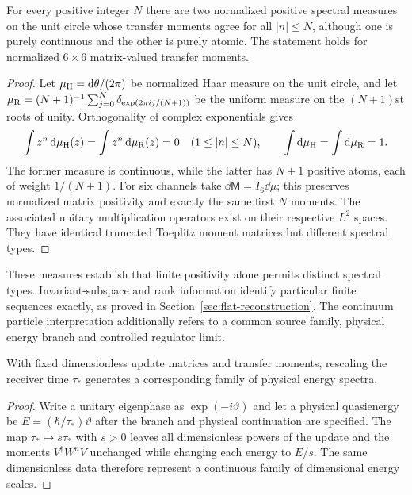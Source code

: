 \begin{proposition}\label{prop:indeterminate}
For every positive integer $N$ there are two normalized positive spectral measures on the unit circle whose transfer moments agree for all $|n|\leq N$, although one is purely continuous and the other is purely atomic. The statement holds for normalized $6\times6$ matrix-valued transfer moments.
\end{proposition}
\begin{proof}
Let $\mu_{\rm H}=\mathrm{d}\theta/(2\pi)$ be normalized Haar measure on the unit circle, and let $\mu_{\rm R}=(N+1)^{-1}\sum_{j=0}^{N}\delta_{\exp(2\pi i j/(N+1))}$ be the uniform measure on the $(N+1)$st roots of unity. Orthogonality of complex exponentials gives
\begin{equation}
\int z^n\,\mathrm{d}\mu_{\rm H}(z)=\int z^n\,\mathrm{d}\mu_{\rm R}(z)=0
\quad(1\leq |n|\leq N),\qquad
\int\mathrm{d}\mu_{\rm H}=\int\mathrm{d}\mu_{\rm R}=1.
\end{equation}
The former measure is continuous, while the latter has $N+1$ positive atoms, each of weight $1/(N+1)$. For six channels take $\dd\mathsf M=I_6\dd\mu$; this preserves normalized matrix positivity and exactly the same first $N$ moments. The associated unitary multiplication operators exist on their respective $L^2$ spaces. They have identical truncated Toeplitz moment matrices but different spectral types.\end{proof}

These measures establish that finite positivity alone permits distinct spectral types. Invariant-subspace and rank information identify particular finite sequences exactly, as proved in Section~\ref{sec:flat-reconstruction}. The continuum particle interpretation additionally refers to a common source family, physical energy branch and controlled regulator limit.

\begin{proposition}\label{prop:scale}
With fixed dimensionless update matrices and transfer moments, rescaling the receiver time $\tau_*$ generates a corresponding family of physical energy spectra.
\end{proposition}
\begin{proof}
Write a unitary eigenphase as $\exp(-i\vartheta)$ and let a physical quasienergy be $E=(\hbar/\tau_*)\vartheta$ after the branch and physical continuation are specified. The map $\tau_*\mapsto s\tau_*$ with $s>0$ leaves all dimensionless powers of the update and the moments $V^\dagger W^nV$ unchanged while changing each energy to $E/s$. The same dimensionless data therefore represent a continuous family of dimensional energy scales.\end{proof}

